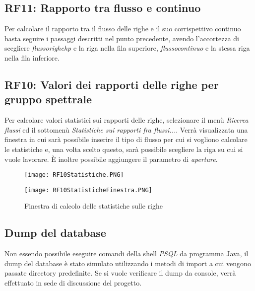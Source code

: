 \documentclass[12pt,a4paper,onecolumn,x11names]{article}
\begin{document}
	\subsection{RF11: Rapporto tra flusso e continuo}
		\begin{flushleft}
			Per calcolare il rapporto tra il flusso delle righe e il suo corrispettivo continuo basta seguire i passaggi descritti nel punto precedente, avendo l'accortezza di scegliere \textit{flussorighehp} e la riga nella fila superiore, \textit{flussocontinuo} e la stessa riga nella fila inferiore.
		\end{flushleft}
	\subsection{RF10: Valori dei rapporti delle righe per gruppo spettrale}
		\begin{flushleft}
			Per calcolare valori statistici sui rapporti delle righe, selezionare il menù \textit{Ricerca flussi} ed il sottomenù \textit{Statistiche sui rapporti fra flussi...}. Verrà visualizzata una finestra in cui sarà possibile inserire il tipo di flusso per cui si vogliono calcolare le statistiche e, una volta scelto questo, sarà possibile scegliere la riga su cui si vuole lavorare. È inoltre possibile aggiungere il parametro di \textit{aperture}.
		\end{flushleft}
		\begin{figure}[!h]
			\centering
			\begin{minipage}[c]{.45\textwidth}
				\texttt{[image: RF10Statistiche.PNG]}
				\caption{Menù da selezionare per\newline calcolare statistiche sulle righe}
			\end{minipage}%
			\centering
			\begin{minipage}[c]{.45\textwidth}
				\texttt{[image: RF10StatisticheFinestra.PNG]}
				\caption{Finestra di calcolo delle statistiche sulle righe}
			\end{minipage}%
		\end{figure}
	\subsection{Dump del database}
		\begin{flushleft}
			Non essendo possibile eseguire comandi della shell \textit{PSQL} da programma Java, il dump del database è stato simulato utilizzando i metodi di import a cui vengono passate directory predefinite.\newline
			Se si vuole verificare il dump da console, verrà effettuato in sede di discussione del progetto.
		\end{flushleft}
\end{document}
